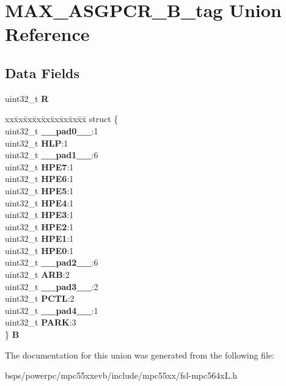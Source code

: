 \hypertarget{unionMAX__ASGPCR__32B__tag}{}\section{M\+A\+X\+\_\+\+A\+S\+G\+P\+C\+R\+\_\+B\+\_\+tag Union Reference}
\label{unionMAX__ASGPCR__32B__tag}
\subsection*{Data Fields}
\begin{DoxyCompactItemize}
\item 
\mbox{\label{unionMAX__ASGPCR__32B__tag_ab9c52986924e31fce465f397974c0449}} 
uint32\+\_\+t {\bfseries R}
\item 
\mbox{\label{unionMAX__ASGPCR__32B__tag_a6df7d6d2e5bac3c8476a015f7f2f2e85}} 
\begin{tabbing}
xx\=xx\=xx\=xx\=xx\=xx\=xx\=xx\=xx\=\kill
struct \{\\
\>uint32\_t {\bfseries \_\_pad0\_\_}:1\\
\>uint32\_t {\bfseries HLP}:1\\
\>uint32\_t {\bfseries \_\_pad1\_\_}:6\\
\>uint32\_t {\bfseries HPE7}:1\\
\>uint32\_t {\bfseries HPE6}:1\\
\>uint32\_t {\bfseries HPE5}:1\\
\>uint32\_t {\bfseries HPE4}:1\\
\>uint32\_t {\bfseries HPE3}:1\\
\>uint32\_t {\bfseries HPE2}:1\\
\>uint32\_t {\bfseries HPE1}:1\\
\>uint32\_t {\bfseries HPE0}:1\\
\>uint32\_t {\bfseries \_\_pad2\_\_}:6\\
\>uint32\_t {\bfseries ARB}:2\\
\>uint32\_t {\bfseries \_\_pad3\_\_}:2\\
\>uint32\_t {\bfseries PCTL}:2\\
\>uint32\_t {\bfseries \_\_pad4\_\_}:1\\
\>uint32\_t {\bfseries PARK}:3\\
\} {\bfseries B}\\

\end{tabbing}\end{DoxyCompactItemize}


The documentation for this union was generated from the following file\+:\begin{DoxyCompactItemize}
\item 
bsps/powerpc/mpc55xxevb/include/mpc55xx/fsl-\/mpc564x\+L.\+h\end{DoxyCompactItemize}
